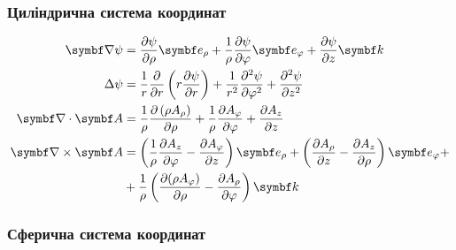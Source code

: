 \subsubsection{Циліндрична система координат}

\begin{align}\label{cylindric}
	\vect{\nabla}\psi & = \frac{\partial \psi}{\partial \rho} \vect{e}_{\rho} + \frac{1}{\rho}\frac{\partial \psi}{\partial \phi} \vect{e}_{\phi} + \frac{\partial \psi}{\partial z} \vect{k}                                                                                            \\
	\Laplasian\psi    & = \frac{1}{r} \frac{\partial }{\partial r} \left( r \frac{\partial \psi}{\partial r} \right) + \frac{1}{r^2} \frac{\partial^2 \psi}{\partial \varphi^2} + \frac{\partial^2 \psi}{\partial z^2}                                                                   \\
	\divg\vect{A}     & = \frac{1}{\rho}\frac{\partial \left(\rho A_{\rho }\right)}{\partial \rho }+\frac{1}{\rho }\frac{\partial A_{\varphi } }{\partial \varphi }+\frac{\partial A_{z}}{\partial z}                                                                                    \\
	\rot\vect{A}      & =\left({\frac {1}{\rho }}{\frac {\partial A_{z}}{\partial \varphi }}-{\frac {\partial A_{\varphi }}{\partial z}}\right)\vect{e}_{\rho}+\left({\frac {\partial A_{\rho }}{\partial z}}-{\frac {\partial A_{z}}{\partial \rho }}\right)\vect{e}_{\phi} + \nonumber \\
	                  & +
	{\frac {1}{\rho }}\left({\frac {\partial (\rho A_{\varphi })}{\partial \rho }}-{\frac {\partial A_{\rho }}{\partial \varphi }}\right)\vect{k}
\end{align}

\subsubsection{Сферична система координат}

